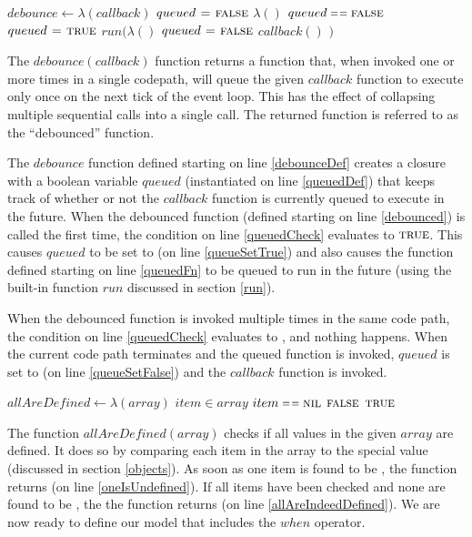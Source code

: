 \begin{codebox}
\li $debounce \gets \lambda(callback)$ \label{debounceDef}
\Do
  \li $queued \mathrel{\hspace{1pt}=\hspace{1pt}} \textnormal{\scshape false}$ \label{queuedDef}
  \li \Return $\lambda()$ \label{debounced}
  \Do
    \li \If $queued \isequal \const{false}$ \label{queuedCheck}
    \Do
      \li $queued \mathrel{\hspace{1pt}=\hspace{1pt}} \textnormal{\scshape true}$ \label{queueSetTrue}
      \li $run(\lambda()$ \label{queuedFn}
      \Do
        \li $queued \mathrel{\hspace{1pt}=\hspace{1pt}} \textnormal{\scshape false}$ \label{queueSetFalse}
        \li $callback()$
      \End
      \li $)$
    \End
  \End
\End
\end{codebox}

The $debounce(callback)$ function returns a function that, when invoked one or more times in a single codepath, will queue the given $callback$ function to execute only once on the next tick of the event loop. This has the effect of collapsing multiple sequential calls into a single call. The returned function is referred to as the ``debounced'' function.

The $debounce$ function defined starting on line \ref{debounceDef} creates a closure with a boolean variable $queued$ (instantiated on line \ref{queuedDef}) that keeps track of whether or not the $callback$ function is currently queued to execute in the future. When the debounced function (defined starting on line \ref{debounced}) is called the first time, the condition on line \ref{queuedCheck} evaluates to $\textnormal{\scshape true}$. This causes $queued$ to be set to  (on line \ref{queueSetTrue}) and also causes the function defined starting on line \ref{queuedFn} to be queued to run in the future (using the built-in function $run$ discussed in section \ref{run}).

When the debounced function is invoked multiple times in the same code path, the condition on line \ref{queuedCheck} evaluates to , and nothing happens. When the current code path terminates and the queued function is invoked, $queued$ is set to  (on line \ref{queueSetFalse}) and the $callback$ function is invoked.

\begin{codebox}
\li $allAreDefined \gets \lambda(array)$
\Do
  \li \For $item \in array$
  \Do
    \li \If $item \isequal \const{nil}$ 
    \Do
      \li \Return $\textnormal{\scshape false}$ \label{oneIsUndefined}
    \End
  \End
  \li \Return $\textnormal{\scshape true}$ \label{allAreIndeedDefined}
\End
\end{codebox}

The function $allAreDefined(array)$ checks if all values in the given $array$ are defined. It does so by comparing each item in the array to the special value  (discussed in section \ref{objects}). As soon as one item is found to be , the function returns  (on line \ref{oneIsUndefined}). If all items have been checked and none are found to be , the the function returns  (on line \ref{allAreIndeedDefined}). We are now ready to define our model that includes the $when$ operator.

